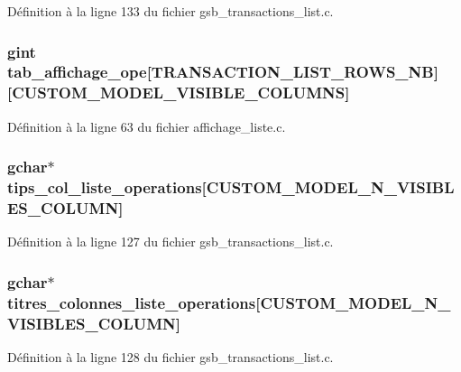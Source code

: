 Définition à la ligne 133 du fichier gsb\_\-transactions\_\-list.c.

\subsubsection[{tab\_\-affichage\_\-ope}]{\setlength{\rightskip}{0pt plus 5cm}gint {\bf tab\_\-affichage\_\-ope}[TRANSACTION\_\-LIST\_\-ROWS\_\-NB][CUSTOM\_\-MODEL\_\-VISIBLE\_\-COLUMNS]}\label{gsb__transactions__list_8c_a0c444565adac369ff42631d4b7b7e6bb}


Définition à la ligne 63 du fichier affichage\_\-liste.c.

\subsubsection[{tips\_\-col\_\-liste\_\-operations}]{\setlength{\rightskip}{0pt plus 5cm}gchar$\ast$ {\bf tips\_\-col\_\-liste\_\-operations}[CUSTOM\_\-MODEL\_\-N\_\-VISIBLES\_\-COLUMN]}\label{gsb__transactions__list_8c_a7d49023563c9144cf16b6b4c2b65ce05}


Définition à la ligne 127 du fichier gsb\_\-transactions\_\-list.c.

\subsubsection[{titres\_\-colonnes\_\-liste\_\-operations}]{\setlength{\rightskip}{0pt plus 5cm}gchar$\ast$ {\bf titres\_\-colonnes\_\-liste\_\-operations}[CUSTOM\_\-MODEL\_\-N\_\-VISIBLES\_\-COLUMN]}\label{gsb__transactions__list_8c_abe5a25ede887e60c7f679c9ff03607f0}


Définition à la ligne 128 du fichier gsb\_\-transactions\_\-list.c.


